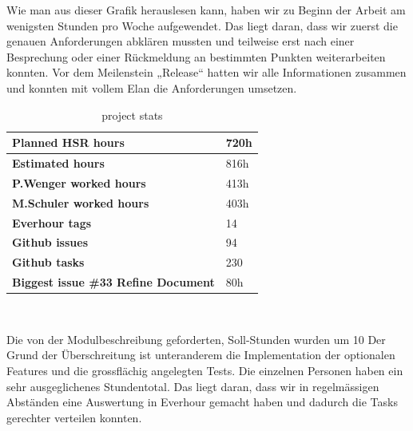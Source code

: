 Wie man aus dieser Grafik herauslesen kann, haben wir zu Beginn der Arbeit 
am wenigsten Stunden pro Woche aufgewendet. Das liegt daran, dass wir zuerst die 
genauen Anforderungen abklären mussten und teilweise erst nach einer Besprechung 
oder einer Rückmeldung an bestimmten Punkten weiterarbeiten konnten. 
Vor dem Meilenstein „Release“ hatten wir alle Informationen zusammen und 
konnten mit vollem Elan die Anforderungen umsetzen.


\begin{table}[H]
  \centering
  \begin{tabular}{|p{100mm}|p{35mm}|}
    \hline 	\bf Planned HSR hours & 720h \\ \hline
	\bf Estimated hours & 816h \\ \hline
	\bf P.Wenger worked hours & 413h \\ \hline
	\bf M.Schuler worked hours & 403h \\ \hline
	\bf Everhour tags & 14 \\ \hline
	\bf Github issues & 94 \\ \hline
	\bf Github tasks & 230 \\ \hline
	\bf Biggest issue \#33 Refine Document & 80h \\ \hline
  \end{tabular} \\
  \caption{project stats}
  \label{tab:projectstats}
\end{table}


Die von der Modulbeschreibung geforderten, Soll-Stunden wurden um 10%
Der Grund der Überschreitung ist unteranderem
die Implementation der optionalen Features und die grossflächig angelegten Tests.
Die einzelnen Personen haben ein sehr ausgeglichenes Stundentotal. 
Das liegt daran, dass wir in regelmässigen Abständen eine Auswertung 
in Everhour gemacht haben und dadurch die Tasks gerechter verteilen konnten. 

